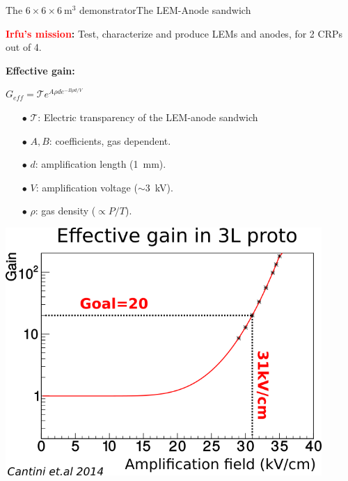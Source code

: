 \documentclass[10pt]{beamer}
\begin{document}
    \begin{frame}{The \texorpdfstring{$6 \times 6 \times \SI{6}{\meter\cubed}$}{666}
    		demonstrator}{The LEM-Anode sandwich}
	    	\begin{scriptsize}
			     \textbf{\textcolor{red}{Irfu's mission}: }Test, characterize and produce  LEMs and anodes, for 2 CRPs out of 4.\\\vfill
			\end{scriptsize}
	   		\begin{minipage}{0.48\textwidth}
	   			\begin{scriptsize}
		   			\textbf{Effective gain:}\\
		   		\end{scriptsize}
	   			$G_{eff} = \mathcal{T}e^{A\rho d e^{-B\rho d/V}}$\\
	   			\begin{tiny}
	    			\begin{itemize}
	    				\item[$\bullet$] $\mathcal{T}$: Electric transparency of the LEM-anode sandwich
	    				\item[$\bullet$] $A,B$: coefficients, gas dependent.
	    				\item[$\bullet$] $d$: amplification length (\SI{1}{\milli\meter}).
	    				\item[$\bullet$] $V$: amplification voltage ($\sim$\SI{3}{\kilo\volt}).
	    				\item[$\bullet$] $\rho$: gas density ($\propto P/T$).
	    			\end{itemize}
	    		\end{tiny} 
	   			\vfill
				\includegraphics[width=0.9\textwidth]{figures/666/3L_gain.png}

\end{minipage}
\end{frame}
\end{document}
